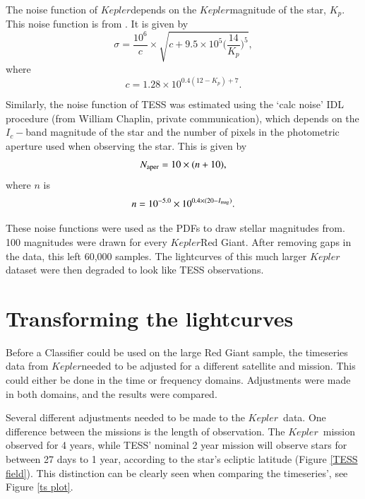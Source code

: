 \documentclass[a4paper,fleqn,usenatbib,useAMS]{mnras}
\newcommand{\kep}{\ensuremath{Kepler}\:}
\begin{document}
The noise function of \kep depends on the \kep magnitude of the star, $K_{p}$. This noise function is from \citet{chaplin_predicting_2011}. It is given by
\begin{equation}
\sigma = \frac{10^{6}}{c} \times \sqrt{c+9.5 \times 10^{5}\Bigg(\frac{14}{K_{p}}\Bigg)^{5}} ,
\label{eq:kep noise}
\end{equation}
where
\begin{equation}
c = 1.28 \times 10^{0.4(12-K_{p})+7} .
\end{equation}

Similarly, the noise function of TESS was estimated using the `calc noise' IDL procedure (from William Chaplin, private communication), which depends on the $I_{c}-$band magnitude of the star and the number of pixels in the photometric aperture used when observing the star. This is given by
\begin{equation}
N_{\rm aper} = 10 \times (n+10) , 
\end{equation}
where $n$ is
\begin{equation}
\label{eq:tess noise}
n = 10^{-5.0} \times 10^{ 0.4 \times (20-I_{\rm mag})} .
\end{equation}

These noise functions were used as the PDFs to draw stellar magnitudes from. 100 magnitudes were drawn for every \kep Red Giant. After removing gaps in the data, this left 60,000 samples. The lightcurves of this much larger \kep dataset were then degraded to look like TESS observations.


\section{Transforming the lightcurves}
\label{sect: dataset}

Before a Classifier could be used on the large Red Giant sample, the timeseries data from \kep needed to be adjusted for a different satellite and mission. This could either be done in the time or frequency domains. Adjustments were made in both domains, and the results were compared. %

Several different adjustments needed to be made to the \kep \ data. One difference between the missions is the length of observation. The \kep \ mission observed for 4 years, while TESS' nominal 2 year mission will observe stars for between 27 days to 1 year, according to the star's ecliptic latitude (Figure \ref{TESS field}). This distinction can be clearly seen when comparing the timeseries', see Figure \ref{ts plot}.
\end{document}
